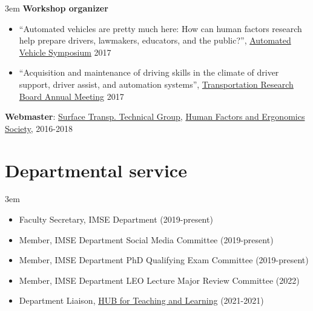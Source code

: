 \documentclass[11pt]{article}
\newenvironment{main}
{\begin{adjustwidth}{3em}{}}
{\end{adjustwidth}}
\begin{document}
\begin{main}
\textbf{Workshop organizer}
\begin{itemize}
    \item ``Automated vehicles are pretty much here: How can human factors research help prepare drivers, lawmakers, educators, and the public?'', \href{www.automatedvehiclessymposium.org}{Automated Vehicle Symposium} 2017
    \item ``Acquisition and maintenance of driving skills in the climate of driver support, driver assist, and automation systems'', \href{http://www.trb.org/AnnualMeeting/}{Transportation Research Board Annual Meeting} 2017
\end{itemize}

\textbf{Webmaster}: \href{http://hfessttg.blogspot.com/}{Surface Transp. Technical Group}, \href{https://www.hfes.org/}{Human Factors and Ergonomics Society}, 2016-2018



\end{main}
\section*{Departmental service}
\begin{main}

\begin{itemize}
    \item Faculty Secretary, IMSE Department (2019-present)
    \item Member, IMSE Department Social Media Committee (2019-present)
    \item Member, IMSE Department PhD Qualifying Exam Committee (2019-present)
    \item Member, IMSE Department LEO Lecture Major Review Committee (2022)
    \item Department Liaison, \href{https://umdearborn.edu/faculty-staff/hub-teaching-learning-resources}{HUB for Teaching and Learning} (2021-2021)
\end{itemize}


\end{main}
\end{document}
